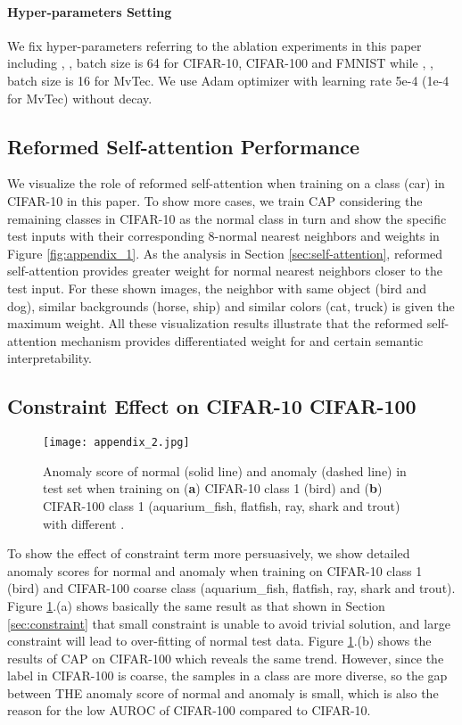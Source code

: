 \documentclass{article}
\begin{document}
\paragraph{Hyper-parameters Setting}
We fix hyper-parameters referring to the ablation experiments in this paper including , , batch size is 64 for CIFAR-10, CIFAR-100 and FMNIST while , , batch size is 16 for MvTec. We use Adam optimizer with learning rate 5e-4 (1e-4 for MvTec) without decay.



\subsection{Reformed Self-attention Performance}

We visualize the role of reformed self-attention when training on a class (car) in CIFAR-10 in this paper. To show more cases, we train CAP considering the remaining classes in CIFAR-10 as the normal class in turn and show the specific test inputs with their corresponding  8-normal nearest neighbors and weights in Figure \ref{fig:appendix_1}. As the analysis in Section \ref{sec:self-attention}, reformed self-attention provides greater weight for normal nearest neighbors closer to the test input. For these shown images, the neighbor with same object (bird and dog), similar backgrounds (horse, ship) and similar colors (cat, truck) is given the maximum weight. All these visualization results illustrate that the reformed self-attention mechanism provides differentiated weight for  and certain semantic interpretability.



\subsection{Constraint Effect on CIFAR-10  CIFAR-100}

\begin{figure}[t]
	\centering
	\texttt{[image: appendix\_2.jpg]}
	\caption{Anomaly score of normal (solid line) and anomaly (dashed line) in test set when training on (\textbf{a}) CIFAR-10 class 1 (bird) and (\textbf{b}) CIFAR-100 class 1 (aquarium\_fish, flatfish, ray, shark and trout) with different .}
	\label{fig:appendix_2}
\end{figure}


To show the effect of constraint term  more persuasively, we show detailed anomaly scores for normal and anomaly when training on CIFAR-10 class 1 (bird) and CIFAR-100 coarse class (aquarium\_fish, flatfish, ray, shark and trout). Figure \ref{fig:appendix_2}.(a) shows basically the same result as that shown in Section \ref{sec:constraint} that small constraint is unable to avoid trivial solution, and large constraint will lead to over-fitting of normal test data. Figure \ref{fig:appendix_2}.(b) shows the results of CAP on CIFAR-100 which reveals the same trend. However, since the label in CIFAR-100 is coarse, the samples in a class are more diverse, so the gap between THE anomaly score of normal and anomaly is small, which is also the reason for the low AUROC of CIFAR-100 compared to CIFAR-10.
\end{document}
